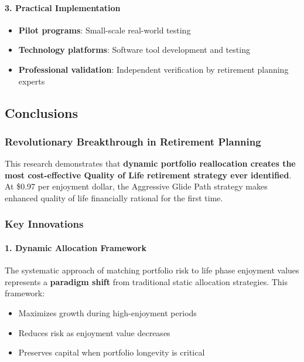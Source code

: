 \documentclass[11pt,letterpaper]{article}
\begin{document}
\paragraph{3. Practical Implementation}
\begin{itemize}
\item \textbf{Pilot programs}: Small-scale real-world testing
\item \textbf{Technology platforms}: Software tool development and testing
\item \textbf{Professional validation}: Independent verification by retirement planning experts
\end{itemize}



\subsection{Conclusions}

\subsubsection{Revolutionary Breakthrough in Retirement Planning}

This research demonstrates that \textbf{dynamic portfolio reallocation creates the most cost-effective Quality of Life retirement strategy ever identified}. At \$0.97 per enjoyment dollar, the Aggressive Glide Path strategy makes enhanced quality of life financially rational for the first time.


\subsubsection{Key Innovations}

\paragraph{1. Dynamic Allocation Framework}
The systematic approach of matching portfolio risk to life phase enjoyment values represents a \textbf{paradigm shift} from traditional static allocation strategies. This framework:

\begin{itemize}
\item Maximizes growth during high-enjoyment periods
\item Reduces risk as enjoyment value decreases
\item Preserves capital when portfolio longevity is critical
\end{itemize}
\end{document}
